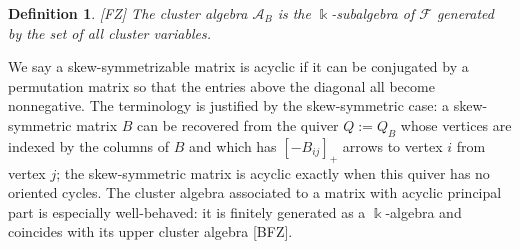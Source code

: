 \documentclass[12pt]{amsart}
\newcommand{\sayHW}[1]{\say[HW]{\color{violet}{\bf HW:}\;#1}}
\newcommand{\sayDR}[1]{\say[DR]{\color{red}{\bf DR:}\;#1}}
\newcommand{\cA}{\mathcal{A}}
\newcommand{\kk}{\Bbbk}%
\newcommand{\cF}{\mathcal{F}}
\newtheorem{definition}[theorem]{Definition}
\theoremstyle{remark}
\numberwithin{equation}{section}
\begin{document}
\begin{definition}
\emph{[FZ]} The cluster algebra $\cA_B$ is the $\kk$-subalgebra of $\cF$ generated by the set of all cluster variables.
\end{definition}


We say a skew-symmetrizable matrix is acyclic if it can be conjugated by a permutation matrix so that the entries above the diagonal all become nonnegative. The terminology is justified by the skew-symmetric case: a skew-symmetric matrix $B$ can be recovered from the quiver $Q := Q_B$ whose vertices are indexed by the columns of $B$ and which has $[-B_{ij}]_+$ arrows to vertex $i$ from vertex $j$; the skew-symmetric matrix is acyclic exactly when this quiver has no oriented cycles. The cluster algebra associated to a matrix with acyclic principal part is especially well-behaved: it is finitely generated as a $\kk$-algebra and %
coincides with its upper cluster algebra [BFZ].%



\end{document}
